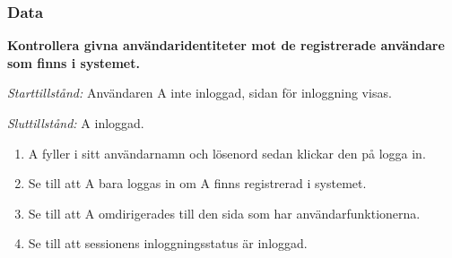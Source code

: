 \documentclass[a4paper]{article}
\begin{document}
\subsubsection{Data}
\begin{FT}
\item
\textbf{Kontrollera givna användaridentiteter mot de registrerade användare som finns i systemet.}

\emph{Starttillstånd:} Användaren A inte inloggad, sidan för inloggning visas.

\emph{Sluttillstånd:} A inloggad.

\begin{enumerate}
\item A fyller i sitt användarnamn och lösenord sedan klickar den på logga in.
\item Se till att A bara loggas in om A finns registrerad i systemet.
\item Se till att A omdirigerades till den sida som har användarfunktionerna.
\item Se till att sessionens inloggningsstatus är inloggad.
\end{enumerate}
\end{FT}
\end{document}
